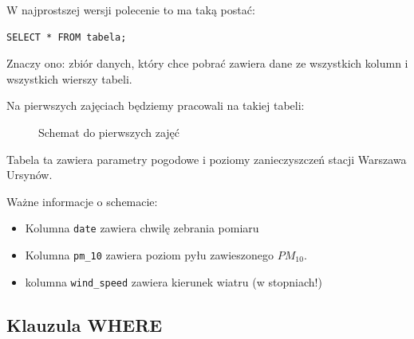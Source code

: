 \documentclass[a4paper]{article}
\begin{document}
W najprostszej wersji polecenie to ma taką postać:

\begin{verbatim}
SELECT * FROM tabela;
\end{verbatim}


Znaczy ono: zbiór danych, który chce pobrać zawiera dane
ze wszystkich kolumn i wszystkich wierszy tabeli.

Na pierwszych zajęciach będziemy pracowali na takiej tabeli:

\begin{figure}
\noindent{}
\caption{Schemat do pierwszych zajęć}
\end{figure}

Tabela ta zawiera parametry pogodowe i poziomy zanieczyszczeń
stacji Warszawa Ursynów.

Ważne informacje o schemacie:
%
\begin{itemize}

\item Kolumna \texttt{date} zawiera chwilę zebrania pomiaru

\item Kolumna \texttt{pm\_10} zawiera poziom pyłu zawieszonego $PM_{10}$.

\item kolumna \texttt{wind\_speed} zawiera kierunek wiatru (w stopniach!)

\end{itemize}


\subsection{Klauzula WHERE%
  \label{klauzula-where}%
}
\end{document}
